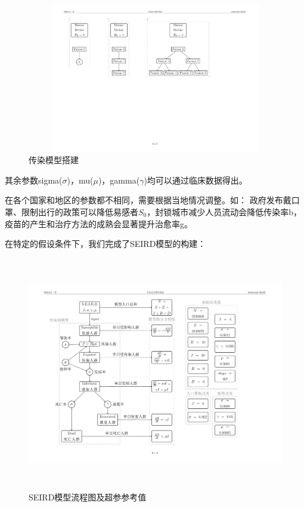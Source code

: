 \documentclass{cumcmthesis}
\begin{document}
\begin{figure}[!htp]
    \centerline{\includegraphics[width=14.25cm,height=6.5cm]{figures/modlingfig_2.pdf}}
    \caption{传染模型搭建}
\end{figure}

\vspace{-0.3cm}
其余参数sigma($\sigma$)，mu($\mu$)，gamma($\gamma$)均可以通过临床数据得出。

在各个国家和地区的参数都不相同，需要根据当地情况调整。如：
政府发布戴口罩、限制出行的政策可以降低易感者$S_0$，封锁城市减少人员流动会降低传染率b，疫苗的产生和治疗方法的成熟会显著提升治愈率g。

在特定的假设条件下，我们完成了SEIRD模型的构建：

\clearpage
\begin{figure}[!htp]
    \centerline{\includegraphics[width=13.596cm,height=10.2cm]{figures/modlingfig_1.pdf}}
    \caption{SEIRD模型流程图及超参参考值}
\end{figure}
\end{document}

